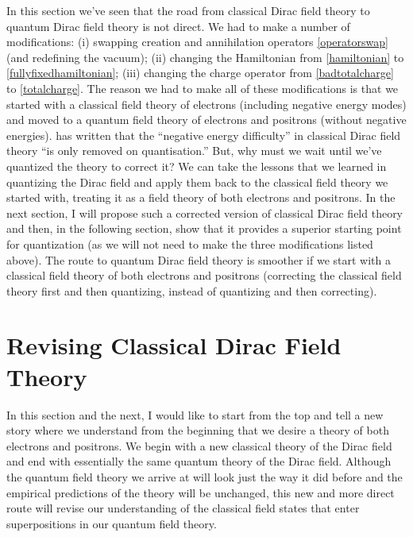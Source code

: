 \documentclass[onecolumn,secnumarabic,amsmath,amssymb,balancelastpage,nofootinbib]{article}
\begin{document}
In this section we've seen that the road from classical Dirac field theory to quantum Dirac field theory is not direct.  We had to make a number of modifications: (i) swapping creation and annihilation operators \eqref{operatorswap} (and redefining the vacuum); (ii) changing the Hamiltonian from \eqref{hamiltonian} to \eqref{fullyfixedhamiltonian}; (iii) changing the charge operator from \eqref{badtotalcharge} to \eqref{totalcharge}.  The reason we had to make all of these modifications is that we started with a classical field theory of electrons (including negative energy modes) and moved to a quantum field theory of electrons and positrons (without negative energies).  \citet[pg.\ 138]{ryder} has written that the ``negative energy difficulty'' in classical Dirac field theory ``is only removed on quantisation.''  But, why must we wait until we've quantized the theory to correct it?  We can take the lessons that we learned in quantizing the Dirac field and apply them back to the classical field theory we started with, treating it as a field theory of both electrons and positrons.  In the next section, I will propose such a corrected version of classical Dirac field theory and then, in the following section, show that it provides a superior starting point for quantization (as we will not need to make the three modifications listed above).  The route to quantum Dirac field theory is smoother if we start with a classical field theory of both electrons and positrons (correcting the classical field theory first and then quantizing, instead of quantizing and then correcting).







\section{Revising Classical Dirac Field Theory}\label{revisingCDFT}

In this section and the next, I would like to start from the top and tell a new story where we understand from the beginning that we desire a theory of both electrons and positrons.  We begin with a new classical theory of the Dirac field and end with essentially the same quantum theory of the Dirac field.  Although the quantum field theory we arrive at will look just the way it did before and the empirical predictions of the theory will be unchanged, this new and more direct route will revise our understanding of the classical field states that enter superpositions in our quantum field theory.
\end{document}
